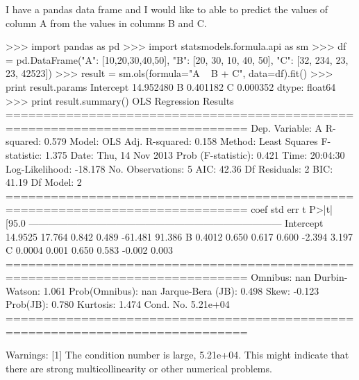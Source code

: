 I have a pandas data frame and I would like to able to predict the values of column A from the values in columns B and C. 



>>> import pandas as pd
>>> import statsmodels.formula.api as sm
>>> df = pd.DataFrame({"A": [10,20,30,40,50], "B": [20, 30, 10, 40, 50], "C": [32, 234, 23, 23, 42523]})
>>> result = sm.ols(formula="A ~ B + C", data=df).fit()
>>> print result.params
Intercept    14.952480
B             0.401182
C             0.000352
dtype: float64
>>> print result.summary()
                            OLS Regression Results                            
==============================================================================
Dep. Variable:                      A   R-squared:                       0.579
Model:                            OLS   Adj. R-squared:                  0.158
Method:                 Least Squares   F-statistic:                     1.375
Date:                Thu, 14 Nov 2013   Prob (F-statistic):              0.421
Time:                        20:04:30   Log-Likelihood:                -18.178
No. Observations:                   5   AIC:                             42.36
Df Residuals:                       2   BIC:                             41.19
Df Model:                           2                                         
==============================================================================
                 coef    std err          t      P>|t|      [95.0%
------------------------------------------------------------------------------
Intercept     14.9525     17.764      0.842      0.489       -61.481    91.386
B              0.4012      0.650      0.617      0.600        -2.394     3.197
C              0.0004      0.001      0.650      0.583        -0.002     0.003
==============================================================================
Omnibus:                          nan   Durbin-Watson:                   1.061
Prob(Omnibus):                    nan   Jarque-Bera (JB):                0.498
Skew:                          -0.123   Prob(JB):                        0.780
Kurtosis:                       1.474   Cond. No.                     5.21e+04
==============================================================================

Warnings:
[1] The condition number is large, 5.21e+04. This might indicate that there are
strong multicollinearity or other numerical problems.
